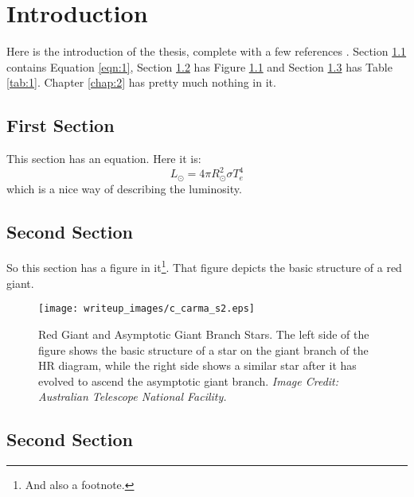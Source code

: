 \chapter{Introduction}
\label{chap:1}


Here is the introduction of the thesis, complete with a few references  \citep{sagan1997demon, prothero2007evolution}.  Section \ref{sec:1} contains Equation \ref{eqn:1}, Section \ref{sec:2} has Figure \ref{fig:1} and Section \ref{sec:3} has Table \ref{tab:1}. Chapter \ref{chap:2} has pretty much nothing in it.

\section{First Section}\label{sec:1}
This section has an equation. Here it is:
\begin{equation}
L_{\odot} = 4\pi R_{\odot}^2 \sigma T_{e}^{4}
\label{eqn:1}
\end{equation}
which is a nice way of describing the luminosity. 

 

\section{Second Section}\label{sec:2}

So this section has a figure in it\footnote{And also a footnote.}. That figure depicts the basic structure of a red giant. 
\begin{figure}[ht!]
\texttt{[image: writeup\_images/c\_carma\_s2.eps]}
\caption[Red Giant and Asymptotic Giant Branch Stars]
{Red Giant and Asymptotic Giant Branch Stars. The left side of the figure shows the basic structure of a star on the giant branch of the HR diagram, while the right side shows a similar star after it has evolved to ascend the asymptotic giant branch. \emph{Image Credit: Australian Telescope National Facility.}
\label{fig:1}}
\end{figure}

\section{Second Section}\label{sec:3}

